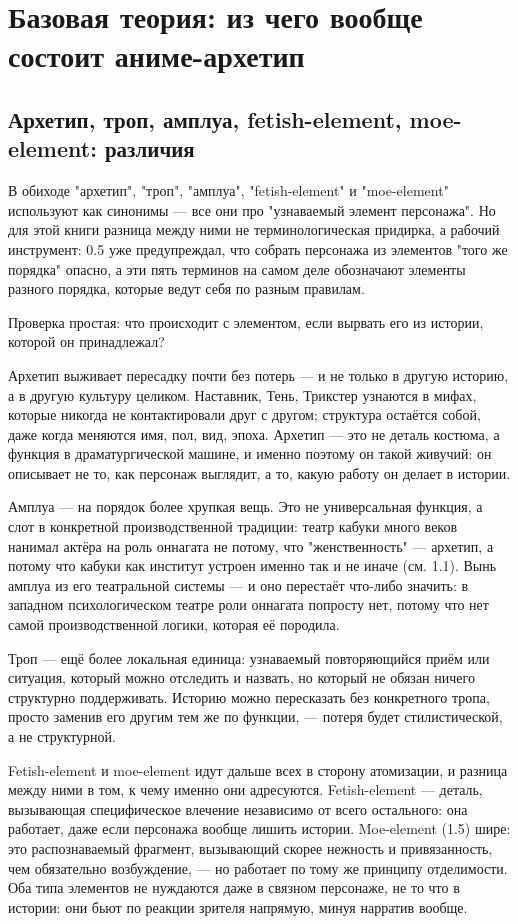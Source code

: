 \setcounter{chapter}{1}
\chapter{Базовая теория: из чего вообще состоит аниме-архетип}

\section{Архетип, троп, амплуа, fetish-element, moe-element: различия}

В обиходе "архетип", "троп", "амплуа", "fetish-element" и "moe-element" используют как синонимы — все они про "узнаваемый элемент персонажа". Но для этой книги разница между ними не терминологическая придирка, а рабочий инструмент: 0.5 уже предупреждал, что собрать персонажа из элементов "того же порядка" опасно, а эти пять терминов на самом деле обозначают элементы разного порядка, которые ведут себя по разным правилам.

Проверка простая: что происходит с элементом, если вырвать его из истории, которой он принадлежал?

Архетип выживает пересадку почти без потерь — и не только в другую историю, а в другую культуру целиком. Наставник, Тень, Трикстер узнаются в мифах, которые никогда не контактировали друг с другом; структура остаётся собой, даже когда меняются имя, пол, вид, эпоха. Архетип — это не деталь костюма, а функция в драматургической машине, и именно поэтому он такой живучий: он описывает не то, как персонаж выглядит, а то, какую работу он делает в истории.

Амплуа — на порядок более хрупкая вещь. Это не универсальная функция, а слот в конкретной производственной традиции: театр кабуки много веков нанимал актёра на роль оннагата не потому, что "женственность" — архетип, а потому что кабуки как институт устроен именно так и не иначе (см. 1.1). Вынь амплуа из его театральной системы — и оно перестаёт что-либо значить: в западном психологическом театре роли оннагата попросту нет, потому что нет самой производственной логики, которая её породила.

Троп — ещё более локальная единица: узнаваемый повторяющийся приём или ситуация, который можно отследить и назвать, но который не обязан ничего структурно поддерживать. Историю можно пересказать без конкретного тропа, просто заменив его другим тем же по функции, — потеря будет стилистической, а не структурной.

Fetish-element и moe-element идут дальше всех в сторону атомизации, и разница между ними в том, к чему именно они адресуются. Fetish-element — деталь, вызывающая специфическое влечение независимо от всего остального: она работает, даже если персонажа вообще лишить истории. Moe-element (1.5) шире: это распознаваемый фрагмент, вызывающий скорее нежность и привязанность, чем обязательно возбуждение, — но работает по тому же принципу отделимости. Оба типа элементов не нуждаются даже в связном персонаже, не то что в истории: они бьют по реакции зрителя напрямую, минуя нарратив вообще.

